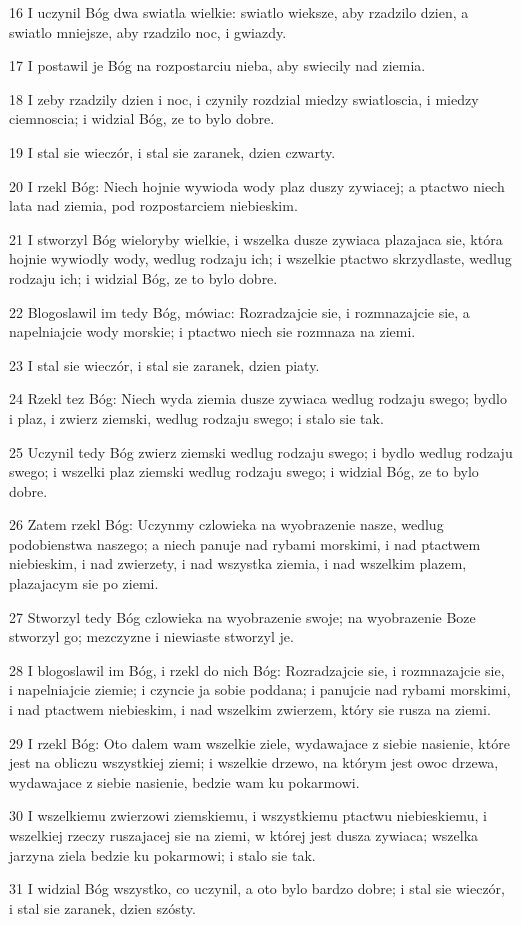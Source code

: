 \par 16 I uczynil Bóg dwa swiatla wielkie: swiatlo wieksze, aby rzadzilo dzien, a swiatlo mniejsze, aby rzadzilo noc, i gwiazdy.
\par 17 I postawil je Bóg na rozpostarciu nieba, aby swiecily nad ziemia.
\par 18 I zeby rzadzily dzien i noc, i czynily rozdzial miedzy swiatloscia, i miedzy ciemnoscia; i widzial Bóg, ze to bylo dobre.
\par 19 I stal sie wieczór, i stal sie zaranek, dzien czwarty.
\par 20 I rzekl Bóg: Niech hojnie wywioda wody plaz duszy zywiacej; a ptactwo niech lata nad ziemia, pod rozpostarciem niebieskim.
\par 21 I stworzyl Bóg wieloryby wielkie, i wszelka dusze zywiaca plazajaca sie, która hojnie wywiodly wody, wedlug rodzaju ich; i wszelkie ptactwo skrzydlaste, wedlug rodzaju ich; i widzial Bóg, ze to bylo dobre.
\par 22 Blogoslawil im tedy Bóg, mówiac: Rozradzajcie sie, i rozmnazajcie sie, a napelniajcie wody morskie; i ptactwo niech sie rozmnaza na ziemi.
\par 23 I stal sie wieczór, i stal sie zaranek, dzien piaty.
\par 24 Rzekl tez Bóg: Niech wyda ziemia dusze zywiaca wedlug rodzaju swego; bydlo i plaz, i zwierz ziemski, wedlug rodzaju swego; i stalo sie tak.
\par 25 Uczynil tedy Bóg zwierz ziemski wedlug rodzaju swego; i bydlo wedlug rodzaju swego; i wszelki plaz ziemski wedlug rodzaju swego; i widzial Bóg, ze to bylo dobre.
\par 26 Zatem rzekl Bóg: Uczynmy czlowieka na wyobrazenie nasze, wedlug podobienstwa naszego; a niech panuje nad rybami morskimi, i nad ptactwem niebieskim, i nad zwierzety, i nad wszystka ziemia, i nad wszelkim plazem, plazajacym sie po ziemi.
\par 27 Stworzyl tedy Bóg czlowieka na wyobrazenie swoje; na wyobrazenie Boze stworzyl go; mezczyzne i niewiaste stworzyl je.
\par 28 I blogoslawil im Bóg, i rzekl do nich Bóg: Rozradzajcie sie, i rozmnazajcie sie, i napelniajcie ziemie; i czyncie ja sobie poddana; i panujcie nad rybami morskimi, i nad ptactwem niebieskim, i nad wszelkim zwierzem, który sie rusza na ziemi.
\par 29 I rzekl Bóg: Oto dalem wam wszelkie ziele, wydawajace z siebie nasienie, które jest na obliczu wszystkiej ziemi; i wszelkie drzewo, na którym jest owoc drzewa, wydawajace z siebie nasienie, bedzie wam ku pokarmowi.
\par 30 I wszelkiemu zwierzowi ziemskiemu, i wszystkiemu ptactwu niebieskiemu, i wszelkiej rzeczy ruszajacej sie na ziemi, w której jest dusza zywiaca; wszelka jarzyna ziela bedzie ku pokarmowi; i stalo sie tak.
\par 31 I widzial Bóg wszystko, co uczynil, a oto bylo bardzo dobre; i stal sie wieczór, i stal sie zaranek, dzien szósty.

